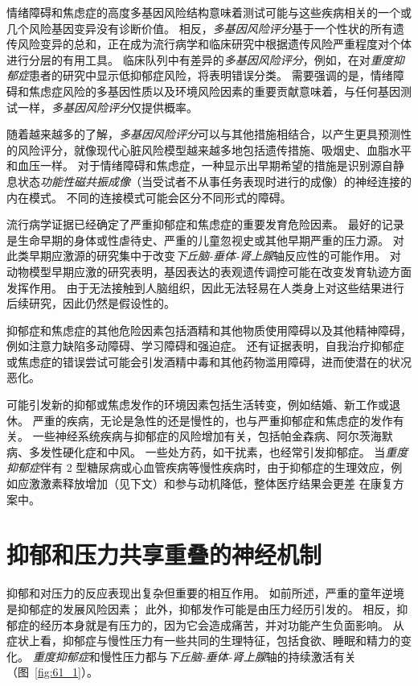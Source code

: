 情绪障碍和焦虑症的高度多基因风险结构意味着测试可能与这些疾病相关的一个或几个风险基因变异没有诊断价值。
相反，\textit{多基因风险评分}基于一个性状的所有遗传风险变异的总和，正在成为流行病学和临床研究中根据遗传风险严重程度对个体进行分层的有用工具。
临床队列中有差异的\textit{多基因风险评分}，例如，在对\textit{重度抑郁症}患者的研究中显示低抑郁症风险，将表明错误分类。
需要强调的是，情绪障碍和焦虑症风险的多基因性质以及环境风险因素的重要贡献意味着，与任何基因测试一样，\textit{多基因风险评分}仅提供概率。


随着越来越多的了解，\textit{多基因风险评分}可以与其他措施相结合，以产生更具预测性的风险评分，就像现代心脏风险模型越来越多地包括遗传措施、吸烟史、血脂水平和血压一样。
对于情绪障碍和焦虑症，一种显示出早期希望的措施是识别源自静息状态\textit{功能性磁共振成像}（当受试者不从事任务表现时进行的成像）的神经连接的内在模式。
不同的连接模式可能会区分不同形式的障碍。


流行病学证据已经确定了严重抑郁症和焦虑症的重要发育危险因素。
最好的记录是生命早期的身体或性虐待史、严重的儿童忽视史或其他早期严重的压力源。
对此类早期应激源的研究集中于改变\textit{下丘脑-垂体-肾上腺}轴反应性的可能作用。
对动物模型早期应激的研究表明，基因表达的表观遗传调控可能在改变发育轨迹方面发挥作用。
由于无法接触到人脑组织，因此无法轻易在人类身上对这些结果进行后续研究，因此仍然是假设性的。


抑郁症和焦虑症的其他危险因素包括酒精和其他物质使用障碍以及其他精神障碍，例如注意力缺陷多动障碍、学习障碍和强迫症。
还有证据表明，自我治疗抑郁症或焦虑症的错误尝试可能会引发酒精中毒和其他药物滥用障碍，进而使潜在的状况恶化。


可能引发新的抑郁或焦虑发作的环境因素包括生活转变，例如结婚、新工作或退休。
严重的疾病，无论是急性的还是慢性的，也与严重抑郁症和焦虑症的发作有关。
一些神经系统疾病与抑郁症的风险增加有关，包括帕金森病、阿尔茨海默病、多发性硬化症和中风。
一些处方药，如干扰素，也经常引发抑郁症。
当\textit{重度抑郁症}伴有 2 型糖尿病或心血管疾病等慢性疾病时，由于抑郁症的生理效应，例如应激激素释放增加（见下文）和参与动机降低，整体医疗结果会更差 在康复方案中。



\section{抑郁和压力共享重叠的神经机制}

抑郁和对压力的反应表现出复杂但重要的相互作用。
如前所述，严重的童年逆境是抑郁症的发展风险因素；
此外，抑郁发作可能是由压力经历引发的。
相反，抑郁症的经历本身就是有压力的，因为它会造成痛苦，并对功能产生负面影响。
从症状上看，抑郁症与慢性压力有一些共同的生理特征，包括食欲、睡眠和精力的变化。
\textit{重度抑郁症}和慢性压力都与\textit{下丘脑-垂体-肾上腺}轴的持续激活有关（图~\ref{fig:61_1}）。


